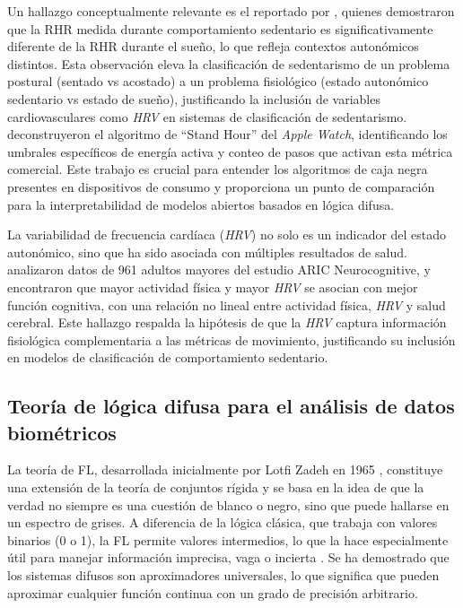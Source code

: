 Un hallazgo conceptualmente relevante es el reportado por \cite{Godkin2025Context}, quienes demostraron que la RHR medida durante comportamiento sedentario es significativamente diferente de la RHR durante el sueño, lo que refleja contextos autonómicos distintos. Esta observación eleva la clasificación de sedentarismo de un problema postural (sentado vs acostado) a un problema fisiológico (estado autonómico sedentario vs estado de sueño), justificando la inclusión de variables cardiovasculares como \textit{HRV} en sistemas de clasificación de sedentarismo. \cite{Lyons2024StandHour} deconstruyeron el algoritmo de ``Stand Hour'' del \textit{Apple Watch}, identificando los umbrales específicos de energía activa y conteo de pasos que activan esta métrica comercial. Este trabajo es crucial para entender los algoritmos de caja negra presentes en dispositivos de consumo y proporciona un punto de comparación para la interpretabilidad de modelos abiertos basados en lógica difusa.

La variabilidad de frecuencia cardíaca (\textit{HRV}) no solo es un indicador del estado autonómico, sino que ha sido asociada con múltiples resultados de salud. \cite{Marino2024ARIC} analizaron datos de 961 adultos mayores del estudio ARIC Neurocognitive, y encontraron que mayor actividad física y mayor \textit{HRV} se asocian con mejor función cognitiva, con una relación no lineal entre actividad física, \textit{HRV} y salud cerebral. Este hallazgo respalda la hipótesis de que la \textit{HRV} captura información fisiológica complementaria a las métricas de movimiento, justificando su inclusión en modelos de clasificación de comportamiento sedentario.

\subsection{Teoría de lógica difusa para el análisis de datos biométricos}
\label{subsec:teoria_logica_difusa}

La teoría de FL, desarrollada inicialmente por Lotfi Zadeh en 1965 \cite{Zadeh1965}, constituye una extensión de la teoría de conjuntos rígida y se basa en la idea de que la verdad no siempre es una cuestión de blanco o negro, sino que puede hallarse en un espectro de grises. A diferencia de la lógica clásica, que trabaja con valores binarios (0 o 1), la FL permite valores intermedios, lo que la hace especialmente útil para manejar información imprecisa, vaga o incierta \cite{Ross2010}. Se ha demostrado que los sistemas difusos son aproximadores universales, lo que significa que pueden aproximar cualquier función continua con un grado de precisión arbitrario.

